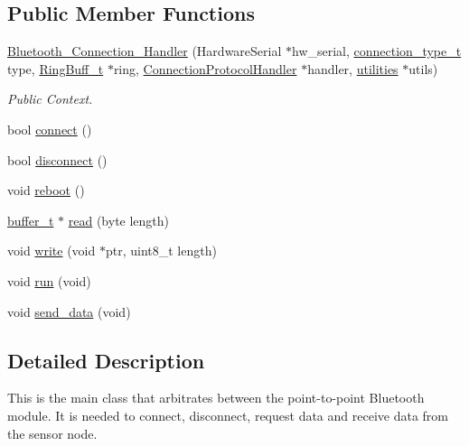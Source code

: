 \subsection*{\-Public \-Member \-Functions}
\begin{DoxyCompactItemize}
\item 
\hyperlink{class_bluetooth___connection___handler_a0732390759ba1b8d14e5ccc5e83ed2cd}{\-Bluetooth\-\_\-\-Connection\-\_\-\-Handler} (\-Hardware\-Serial $\ast$hw\-\_\-serial, \hyperlink{_connection_handler_8h_a688c9994fcf706765d41a72e7e9e39a5}{connection\-\_\-type\-\_\-t} type, \hyperlink{struct_ring_buff__t}{\-Ring\-Buff\-\_\-t} $\ast$ring, \hyperlink{class_connection_protocol_handler}{\-Connection\-Protocol\-Handler} $\ast$handler, \hyperlink{classutilities}{utilities} $\ast$utils)
\begin{DoxyCompactList}\small\item\em \-Public \-Context. \end{DoxyCompactList}\item 
bool \hyperlink{class_bluetooth___connection___handler_ada4a47ada49b62071fba9d23b63cd128}{connect} ()
\item 
bool \hyperlink{class_bluetooth___connection___handler_a35de0a32d9f48521c8e3afd30df823f5}{disconnect} ()
\item 
void \hyperlink{class_bluetooth___connection___handler_a69604d969ecc0514948314cb7b78cd1d}{reboot} ()
\item 
\hyperlink{structbuffer__t}{buffer\-\_\-t} $\ast$ \hyperlink{class_bluetooth___connection___handler_a03944d3fb682688354c132878dd3d8f0}{read} (byte length)
\item 
void \hyperlink{class_bluetooth___connection___handler_a5970fc3699bcd204f256b4e9e31b4dcb}{write} (void $\ast$ptr, uint8\-\_\-t length)
\item 
void \hyperlink{class_bluetooth___connection___handler_aeccdb22a55988eac70feb174ec10eefb}{run} (void)
\item 
void \hyperlink{class_bluetooth___connection___handler_a5dd84b55bb92330219825fe4d80f8e56}{send\-\_\-data} (void)
\end{DoxyCompactItemize}


\subsection{\-Detailed \-Description}
\-This is the main class that arbitrates between the point-\/to-\/point \-Bluetooth module. \-It is needed to connect, disconnect, request data and receive data from the sensor node.


